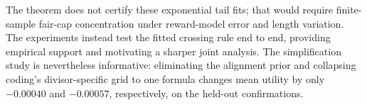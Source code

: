 The theorem does not certify these exponential tail fits; that would require
finite-sample fair-cap concentration under reward-model error and length
variation.  The experiments instead test the fitted crossing rule end to end,
providing empirical support and motivating a sharper joint analysis.  The
simplification study is nevertheless informative: eliminating the alignment
prior and collapsing coding's divisor-specific grid to one formula changes
mean utility by only $-0.00040$ and $-0.00057$, respectively, on the held-out
confirmations.
